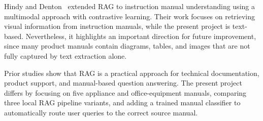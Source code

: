 Hindy and Denton~\cite{hindy2024instructionmanual} extended RAG to instruction manual understanding using a multimodal approach with contrastive learning. Their work focuses on retrieving visual information from instruction manuals, while the present project is text-based. Nevertheless, it highlights an important direction for future improvement, since many product manuals contain diagrams, tables, and images that are not fully captured by text extraction alone.

Prior studies show that RAG is a practical approach for technical documentation, product support, and manual-based question answering. The present project differs by focusing on five appliance and office-equipment manuals, comparing three local RAG pipeline variants, and adding a trained manual classifier to automatically route user queries to the correct source manual.